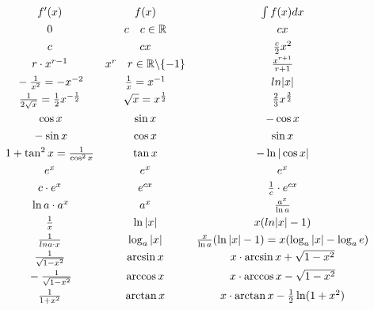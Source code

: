\begin{equation*}
\begin{matrix}
f'(x) & f(x) & \int f(x) dx\\
\rule{0pt}{12pt}0 & c \quad c \in \mathbb{R} & cx \\
\rule{0pt}{12pt}c & cx & \frac{c}{2}x^2 \\
\rule{0pt}{12pt}r \cdot x^{r-1} & x^r \quad r \in \mathbb{R} \backslash \{-1\} & \frac{x^{r+1}}{r+1} \\
\rule{0pt}{12pt}-\frac{1}{x^2} = -x^{-2} & \frac{1}{x} = x^{-1} & ln{|x|} \\
\rule{0pt}{12pt}\frac{1}{2\sqrt{x}} = \frac{1}{2}x^{-\frac{1}{2}} & \sqrt{x} = x^{\frac{1}{2}} & \frac{2}{3}x^{\frac{3}{2}} \\
\rule{0pt}{12pt}\cos x & \sin x & -\cos x \\
\rule{0pt}{12pt}-\sin x & \cos x & \sin x \\
\rule{0pt}{12pt}1 + \tan^2 x = \frac{1}{\cos^2 x} & \tan x & -\ln |\cos x| \\
\rule{0pt}{12pt}e^x & e^x & e^x \\
\rule{0pt}{12pt}c \cdot e^x & e^{cx} & \frac{1}{c} \cdot e^{cx} \\
\rule{0pt}{12pt}\ln a \cdot a^x & a^x & \frac{a^x}{\ln a} \\
\rule{0pt}{12pt}\frac{1}{x} & \ln |x| & x(ln |x| - 1) \\
\rule{0pt}{12pt}\frac{1}{ln a \cdot x} & \log_a |x| & \frac{x}{\ln a}(\ln |x| - 1) = x(\log_a |x| - \log_a e) \\
\rule{0pt}{12pt}\frac{1}{\sqrt{1 - x^2}} & \arcsin x & x \cdot \arcsin x + \sqrt{1 - x^2} \\
\rule{0pt}{12pt}-\frac{1}{\sqrt{1 - x^2}} & \arccos x & x \cdot \arccos x - \sqrt{1 - x^2} \\
\rule{0pt}{12pt}\frac{1}{1 + x^2} & \arctan x & x \cdot \arctan x - \frac{1}{2}\ln(1 + x^2) \\
\end{matrix}
\end{equation*}
\normalsize
